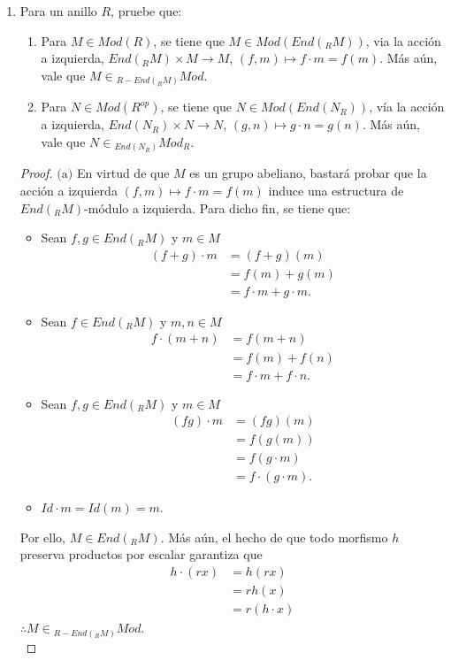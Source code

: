 \documentclass{article}
\newcommand{\lrprth}[1]{
	\left(#1\right)
}
\newcommand{\opst}[1]{
	{#1}^{op}
}
\theoremstyle{definition}
\theoremstyle{plain}
\theoremstyle{plain}
\theoremstyle{definition}
\theoremstyle{definition}
\theoremstyle{definition}
\theoremstyle{definition}
\theoremstyle{definition}
\theoremstyle{definition}
\begin{document}
\begin{enumerate}[label=\textbf{Ej \arabic*.}]
\item Para un anillo $R$, pruebe que:
\begin{enumerate}
	\item Para $M \in Mod\lrprth{R}$, se tiene que $M \in Mod\lrprth{End\lrprth{_{R}M}}$, via la acción a izquierda, $End\lrprth{_{R}M} \times M \longrightarrow M$, $\lrprth{f,m} \mapsto f \cdot m = f\lrprth{m}$. Más aún, vale que $M \in {}_{R-End\lrprth{_{R}M}}Mod$.
	\item Para $N \in Mod\lrprth{\opst{R}}$, se tiene que $N \in Mod\lrprth{End\lrprth{N_{R}}}$, vía la acción a izquierda, $End\lrprth{N_{R}} \times N \longrightarrow N$, $\lrprth{g,n} \mapsto g \cdot n = g\lrprth{n}$. Más aún, vale que $N \in {}_{End\lrprth{N_{R}}}Mod_{R}$.
\end{enumerate}
\begin{proof}
	$\boxed{\text{(a)}}$ En virtud de que $M$ es un grupo abeliano, bastará probar que la acción a izquierda $\lrprth{f,m} \mapsto f \cdot m = f\lrprth{m}$ induce una estructura de $End\lrprth{_{R}M}$-módulo a izquierda. Para dicho fin, se tiene que:
	\begin{itemize}
		\item Sean $f,g \in End\lrprth{_{R}M}$ y $m \in M$
		\begin{align*}
			\lrprth{f+g} \cdot m&=\lrprth{f+g}\lrprth{m}\\
			&=f\lrprth{m}+g\lrprth{m}\\
			&=f \cdot m+g \cdot m.
		\end{align*}
		\item Sean $f \in End\lrprth{_{R}M}$ y $m,n \in M$
		\begin{align*}
			f \cdot \lrprth{m+n}&=f\lrprth{m+n}\\
			&=f\lrprth{m}+f\lrprth{n}\\
			&=f \cdot m+f \cdot n.
		\end{align*}
		\item Sean $f,g \in End\lrprth{_{R}M}$ y $m \in M$
		\begin{align*}
			\lrprth{fg} \cdot m&=\lrprth{fg}\lrprth{m}\\
			&=f\lrprth{g\lrprth{m}}\\
			&=f\lrprth{g \cdot m}\\
			&=f \cdot \lrprth{g \cdot m}.
		\end{align*}
		\item $Id \cdot m=Id\lrprth{m}=m$.
	\end{itemize}
	Por ello, $M \in End\lrprth{_{R}M}$. Más aún, el hecho de que todo morfismo $h$ preserva productos por escalar garantiza que
	\begin{align*}
		h \cdot \lrprth{rx}&=h\lrprth{rx}\\
		&=rh\lrprth{x}\\
		&=r\lrprth{h \cdot x}
	\end{align*}
	$\therefore M \in {}_{R-End\lrprth{_{R}M}}Mod$.\\
	

\end{proof}
\end{enumerate}
\end{document}
